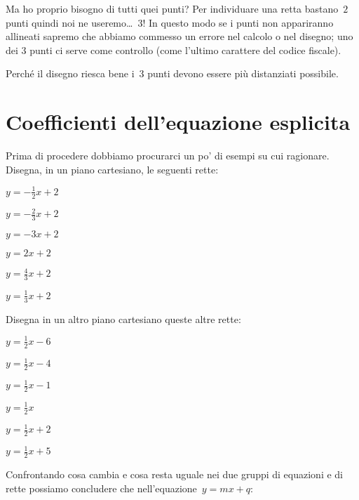 Ma ho proprio bisogno di tutti quei punti? Per individuare una retta 
bastano~\(2\) punti quindi noi ne useremo\dots~\(3\)! In questo modo se 
i punti non appariranno allineati sapremo che abbiamo commesso un errore 
nel calcolo o nel disegno; uno dei \(3\) punti ci serve come controllo 
(come l'ultimo carattere del codice fiscale).

Perché il disegno riesca bene i~\(3\) punti devono essere più distanziati 
possibile.

\section{Coefficienti dell'equazione esplicita}
\label{sec:retta_coefficienti}

Prima di procedere dobbiamo procurarci un po' di esempi su cui ragionare.
Disegna, in un piano cartesiano, le seguenti rette:

\begin{multicols}{3}
 \TabPositions{0.6cm}
 \begin{enumeratea}
 \item \(y=-\frac{1}{2}x + 2\)
 \item \(y=-\frac{2}{3}x + 2\)
 \item \(y=-{3}x + 2\)
 \item \(y={2}x + 2\)
 \item \(y=\frac{4}{3}x + 2\)
 \item \(y=\frac{1}{3}x + 2\)
 \end{enumeratea}
\end{multicols}

Disegna in un altro piano cartesiano queste altre rette:

\begin{multicols}{3}
 \TabPositions{0.6cm}
 \begin{enumeratea}
 \item \(y=\frac{1}{2}x - 6\)
 \item \(y=\frac{1}{2}x -4\)
 \item \(y=\frac{1}{2}x -1\)
 \item \(y=\frac{1}{2}x\)
 \item \(y=\frac{1}{2}x + 2\)
 \item \(y=\frac{1}{2}x + 5\)
 \end{enumeratea}
\end{multicols}

Confrontando cosa cambia e cosa resta uguale nei due gruppi di equazioni 
e di rette possiamo concludere che nell'equazione~\(y=mx+q\):

